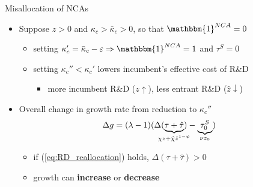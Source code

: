 \documentclass[english,usenames,dvipsnames]{beamer}
\begin{document}
\begin{frame}{Misallocation of NCAs}\label{misallocation_of_nca} 
	\hyperlink{efficiency}{}
	\begin{itemize}
		\item  Suppose $z > 0$ and $\kappa_c > \bar{\kappa}_c > 0$, so that $\mathbbm{1}^{NCA} = 0$ 
		\begin{itemize}
			\item setting $\kappa_c' = \bar{\kappa}_c - \varepsilon \Rightarrow \mathbbm{1}^{NCA} = 1$ and $\tau^S = 0$
			\item setting $\kappa_c'' < \kappa_c'$ lowers incumbent's effective cost of R\&D
			\begin{itemize}
				\item more incumbent R\&D ($z \uparrow$), less entrant R\&D ($\hat{z} \downarrow$)
			\end{itemize}
		\end{itemize}
		\item  Overall change in growth rate from reduction to $\kappa_c''$
		\begin{align*}
			\Delta g  &= (\lambda -1) (\Delta (\underbrace{\tau + \hat{\tau}}_{\mathclap{\chi z + \hat{\chi} \hat{z}^{1-\psi}}}) - \underbrace{\tau^S_0}_{\mathclap{ \nu z_0}})
		\end{align*}
		\begin{itemize}
			\item if (\ref{eq:RD_reallocation}) holds, $\Delta(\tau+ \hat{\tau}) > 0$ 
			\item growth can \alert{\textbf{increase}} or \alert{\textbf{decrease}}  
		\end{itemize}
	\end{itemize}
\end{frame}
\end{document}
